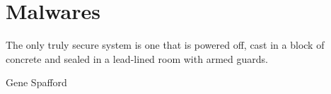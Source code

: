 \section{Malwares}

\epigraph{The only truly secure system is one that is powered off, cast in a block of concrete and sealed in a lead-lined room with armed guards.}{Gene Spafford}





